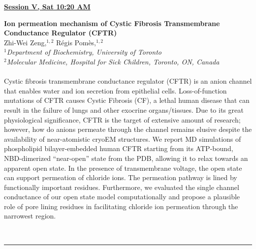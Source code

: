 \documentclass[titlepage,oneside,openany,10pt]{book}
\newenvironment{oralabs}[4] %
        {
        \begin{flushright}
                \underline{\textbf{#4}}
        \end{flushright}
        \textbf{#1}\\%
        #2\\%
        \textit{#3}\\\\%
        }
        {
        \\
        \noindent\rule{15cm}{0.5pt}%
        }
\begin{document}
\begin{oralabs}
    {Ion permeation mechanism of Cystic Fibrosis Transmembrane Conductance Regulator (CFTR)}
    {Zhi-Wei Zeng,$^{1,2}$ R\'{e}gis Pom\`{e}s,$^{1,2}$}
    {
    $^1$Department of Biochemistry, University of Toronto\\
    $^2$Molecular Medicine, Hospital for Sick Children, Toronto, ON, Canada
    }
    {Session V, Sat 10:20 AM}
    Cystic fibrosis transmembrane conductance regulator (CFTR) is an anion channel that enables water and ion secretion from epithelial cells. Loss-of-function mutations of CFTR causes Cystic Fibrosis (CF), a lethal human disease that can result in the failure of lungs and other exocrine organs/tissues. Due to its great physiological significance, CFTR is the target of extensive amount of research; however, how do anions permeate through the channel remains elusive despite the availability of near-atomistic cryoEM structures. We report MD simulations of phospholipid bilayer-embedded human CFTR starting from its ATP-bound, NBD-dimerized ``near-open'' state from the PDB, allowing it to relax towards an apparent open state. In the presence of transmembrane voltage, the open state can support permeation of chloride ions. The permeation pathway is lined by functionally important residues. Furthermore, we evaluated the single channel conductance of our open state model computationally and propose a plausible role of pore lining residues in facilitating chloride ion permeation through the narrowest region.
    \label{ZengZ}
\end{oralabs}

\vspace{1cm}
\end{document}
